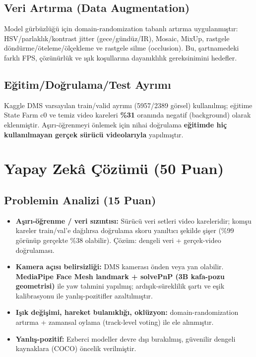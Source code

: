 \documentclass[onecolumn,11pt]{IEEEtran}
\begin{document}
\subsection{Veri Artırma (Data Augmentation)}
Model gürbüzlüğü için domain-randomization tabanlı artırma uygulanmıştır:
HSV/parlaklık/kontrast jitter (gece/gündüz/IR), Mosaic, MixUp, rastgele
döndürme/öteleme/ölçekleme ve rastgele silme (occlusion). Bu, şartnamedeki farklı
FPS, çözünürlük ve ışık koşullarına dayanıklılık gereksinimini hedefler.

\subsection{Eğitim/Doğrulama/Test Ayrımı}
Kaggle DMS varsayılan train/valid ayrımı (5957/2389 görsel) kullanılmış; eğitime
State Farm c0 ve temiz video kareleri \textbf{\%31} oranında negatif (background)
olarak eklenmiştir. Aşırı-öğrenmeyi önlemek için nihai doğrulama
\textbf{eğitimde hiç kullanılmayan gerçek sürücü videolarıyla} yapılmıştır.

\section{Yapay Zekâ Çözümü (50 Puan)}

\subsection{Problemin Analizi (15 Puan)}
\begin{itemize}[nosep,leftmargin=*]
  \item \textbf{Aşırı-öğrenme / veri sızıntısı:} Sürücü veri setleri video
        kareleridir; komşu kareler train/val'e dağılırsa doğrulama skoru
        yanıltıcı şekilde şişer (\%99 görünüp gerçekte \%38 olabilir). Çözüm:
        dengeli veri + gerçek-video doğrulaması.
  \item \textbf{Kamera açısı belirsizliği:} DMS kamerası önden veya yan olabilir.
        \textbf{MediaPipe Face Mesh landmark + solvePnP (3B kafa-pozu geometrisi)}
        ile yaw tahmini yapılmış; ardışık-süreklilik şartı ve eşik kalibrasyonu ile
        yanlış-pozitifler azaltılmıştır.
  \item \textbf{Işık değişimi, hareket bulanıklığı, oklüzyon:} domain-randomization
        artırma + zamansal oylama (track-level voting) ile ele alınmıştır.
  \item \textbf{Yanlış-pozitif:} Ezberci modeller devre dışı bırakılmış, güvenilir
        dengeli kaynaklara (COCO) öncelik verilmiştir.
\end{itemize}
\end{document}
